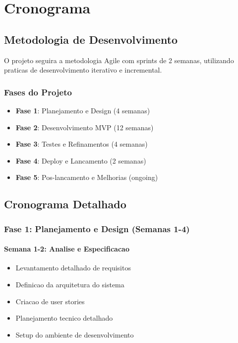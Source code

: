 \section{Cronograma}

\subsection{Metodologia de Desenvolvimento}

O projeto seguira a metodologia Agile com sprints de 2 semanas, utilizando praticas de desenvolvimento iterativo e incremental.

\subsubsection{Fases do Projeto}
\begin{itemize}
    \item \textbf{Fase 1}: Planejamento e Design (4 semanas)
    \item \textbf{Fase 2}: Desenvolvimento MVP (12 semanas)
    \item \textbf{Fase 3}: Testes e Refinamentos (4 semanas)
    \item \textbf{Fase 4}: Deploy e Lancamento (2 semanas)
    \item \textbf{Fase 5}: Pos-lancamento e Melhorias (ongoing)
\end{itemize}

\subsection{Cronograma Detalhado}

\subsubsection{Fase 1: Planejamento e Design (Semanas 1-4)}

\paragraph{Semana 1-2: Analise e Especificacao}
\begin{itemize}
    \item Levantamento detalhado de requisitos
    \item Definicao da arquitetura do sistema
    \item Criacao de user stories
    \item Planejamento tecnico detalhado
    \item Setup do ambiente de desenvolvimento
\end{itemize}

